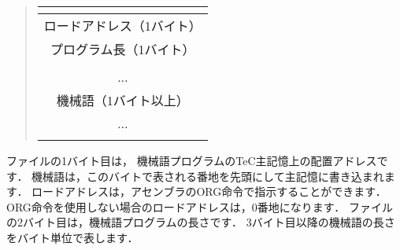 \begin{quote}
{\small\bf\begin{tabular}{|c|}
\multicolumn{1}{c}{}\\
\hline
ロードアドレス（1バイト） \\
\hline
プログラム長（1バイト） \\
\hline
\\
...\\
機械語（1バイト以上） \\
...\\
\\
\hline
\end{tabular}}
\end{quote}

ファイルの1バイト目は，
機械語プログラムのTeC主記憶上の配置アドレスです．
機械語は，このバイトで表される番地を先頭にして主記憶に書き込まれます．
ロードアドレスは，アセンブラのORG命令で指示することができます．
ORG命令を使用しない場合のロードアドレスは，0番地になります．
ファイルの2バイト目は，機械語プログラムの長さです．
3バイト目以降の機械語の長さをバイト単位で表します．

